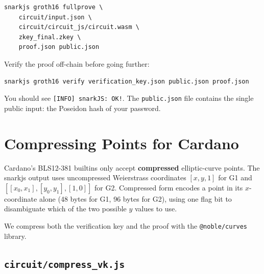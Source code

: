 \begin{verbatim}
snarkjs groth16 fullprove \
    circuit/input.json \
    circuit/circuit_js/circuit.wasm \
    zkey_final.zkey \
    proof.json public.json
\end{verbatim}

Verify the proof off-chain before going further:

\begin{verbatim}
snarkjs groth16 verify verification_key.json public.json proof.json
\end{verbatim}

You should see \texttt{[INFO] snarkJS: OK!}. The \texttt{public.json} file
contains the single public input: the Poseidon hash of your password.

\section{Compressing Points for Cardano} \label{sec:ch6-compress}

Cardano's BLS12-381 builtins only accept \textbf{compressed} elliptic-curve
points. The snarkjs output uses uncompressed Weierstrass coordinates
$[x, y, 1]$ for G1 and $[[x_0, x_1], [y_0, y_1], [1, 0]]$ for G2.
Compressed form encodes a point in its $x$-coordinate alone (48 bytes for G1,
96 bytes for G2), using one flag bit to disambiguate which of the two possible
$y$ values to use.

We compress both the verification key and the proof with the
\texttt{@noble/curves} library.

\subsection*{\texttt{circuit/compress\_vk.js}}

